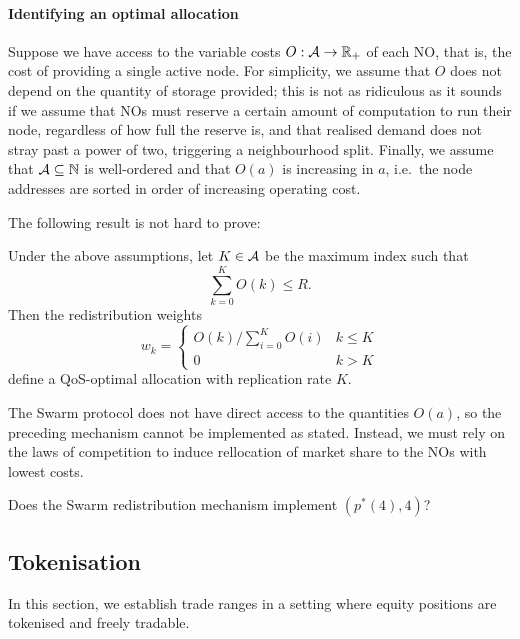 \paragraph{Identifying an optimal allocation}
Suppose we have access to the variable costs $O:\mathcal{A}\rightarrow\mathbb{R}_+$ of each NO, that is, the cost of providing a single active node.
%
For simplicity, we assume that $O$ does not depend on the quantity of storage provided; this is not as ridiculous as it sounds if we assume that NOs must reserve a certain amount of computation to run their node, regardless of how full the reserve is, and that realised demand does not stray past a power of two, triggering a neighbourhood split.
%
Finally, we assume that $\mathcal{A}\subseteq\mathbb{N}$ is well-ordered and that $O(a)$ is increasing in $a$, i.e.~the node addresses are sorted in order of increasing operating cost.

The following result is not hard to prove:
%
\begin{proposition*}
  Under the above assumptions, let $K\in\mathcal{A}$ be the maximum index such that
  \[
    \sum_{k=0}^KO(k) \leq R.
  \]
  Then the redistribution weights
  \[
    w_k = \left\{ \begin{array}{ll}
      O(k)/\sum_{i=0}^KO(i) & k\leq K \\
      0 & k > K
    \end{array} \right.
  \]
  define a QoS-optimal allocation with replication rate $K$.
\end{proposition*}

The Swarm protocol does not have direct access to the quantities $O(a)$, so the preceding mechanism cannot be implemented as stated.
%
Instead, we must rely on the laws of competition to induce rellocation of market share to the NOs with lowest costs.

\begin{question} Does the Swarm redistribution mechanism implement $(p^*(4),4)$? \end{question}

\subsection{Tokenisation}

In this section, we establish trade ranges in a setting where equity positions are tokenised and freely tradable.

